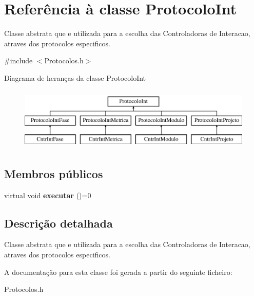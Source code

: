 \hypertarget{class_protocolo_int}{
\section{\-Referência à classe \-Protocolo\-Int}
\label{class_protocolo_int}
}


\-Classe abstrata que e utilizada para a escolha das \-Controladoras de \-Interacao, atraves dos protocolos especificos.  




{\ttfamily \#include $<$\-Protocolos.\-h$>$}

\-Diagrama de heranças da classe \-Protocolo\-Int\begin{figure}[H]
\begin{center}
\leavevmode
\includegraphics[height=3.000000cm]{class_protocolo_int}
\end{center}
\end{figure}
\subsection*{\-Membros públicos}
\begin{DoxyCompactItemize}
\item 
\hypertarget{class_protocolo_int_a3e0dfb20671385070149211a28a19f85}{
virtual void {\bfseries executar} ()=0}
\label{class_protocolo_int_a3e0dfb20671385070149211a28a19f85}

\end{DoxyCompactItemize}


\subsection{\-Descrição detalhada}
\-Classe abstrata que e utilizada para a escolha das \-Controladoras de \-Interacao, atraves dos protocolos especificos. 

\-A documentação para esta classe foi gerada a partir do seguinte ficheiro\-:\begin{DoxyCompactItemize}
\item 
\-Protocolos.\-h\end{DoxyCompactItemize}
